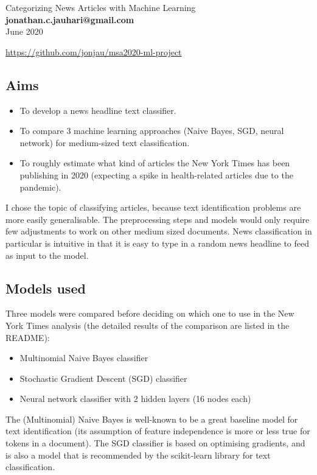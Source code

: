 \documentclass[11pt]{article}
\begin{document}
\Large{Categorizing News Articles with Machine Learning} \\[2mm]
\large\textbf{jonathan.c.jauhari@gmail.com} \\[2mm]
\large{June 2020}

\url{https://github.com/jonjau/msa2020-ml-project}

\subsection*{Aims}

\begin{itemize}
    \item To develop a news headline text classifier.
    \item To compare 3 machine learning approaches (Naive Bayes, SGD, neural 
          network) for medium-sized text classification.
    \item To roughly estimate what kind of articles the New York Times has been
          publishing in 2020 (expecting a spike in health-related articles
          due to the pandemic).
\end{itemize}

I chose the topic of classifying articles, because text identification
problems are more easily generalisable. The preprocessing steps and models
would only require few adjustments to work on other medium sized documents.
News classification in particular is intuitive in that it is easy to type in
a random news headline to feed as input to the model.


\subsection*{Models used}

Three models were compared before deciding on which one to use in the New
York Times analysis (the detailed results of the comparison are listed in the
README):

\begin{itemize}
    \item Multinomial Naive Bayes classifier
    \item Stochastic Gradient Descent (SGD) classifier
    \item Neural network classifier with 2 hidden layers (16 nodes each)
\end{itemize}

The (Multinomial) Naive Bayes is well-known to be a great baseline model for
text identification (its assumption of feature independence is more or less
true for tokens in a document). The SGD classifier is based on
optimising gradients, and is also a model that is recommended by the
scikit-learn library for text classification.
\end{document}
